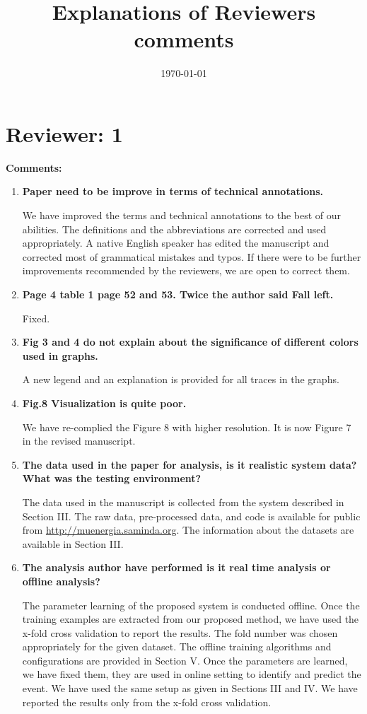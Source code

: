 \documentclass[12pt]{article}
\title{Explanations of Reviewers comments}
\date{\today}
\begin{document}
\maketitle

\section*{Reviewer: 1}


\textbf{Comments:}

\begin{enumerate}

\item \textbf{Paper need to be improve in terms of technical annotations.}

We have improved the terms and technical annotations to the best of our abilities. The 
definitions and the abbreviations are corrected and used appropriately.  A native 
English 
speaker has edited the manuscript and corrected most of grammatical mistakes and typos.  
If there 
were to be further improvements recommended by the reviewers, we are open to correct 
them. 

\item \textbf{Page 4 table 1 page 52 and 53. Twice the author said Fall left.}

Fixed.

\item \textbf{Fig 3 and 4 do not explain about the significance of different colors used 
in 
graphs.}

A new legend and an explanation is provided for all traces in the graphs. 

\item \textbf{Fig.8 Visualization is quite poor.}

We have re-complied the Figure 8 with higher resolution. It is now Figure 7 in the 
revised manuscript.   

\item \textbf{The data used in the paper for analysis, is it realistic system data? What 
was the testing environment?}

The data used in the manuscript is collected from the system described in Section III. 
The 
raw data, pre-processed data, and code is available for public from 
\url{http://muenergia.saminda.org}. The information about the datasets are available in 
Section III. 

\item \textbf{The analysis author have performed is it real time analysis or offline 
analysis?}

The parameter learning of the proposed system is conducted offline. Once the training 
examples are extracted from our proposed method, we have used the x-fold cross validation 
to report the results. The fold number was chosen appropriately for the given dataset. 
The offline training algorithms and configurations are provided in Section V. Once the 
parameters are learned, we have fixed them, they are used in online setting to identify 
and predict the event. We have used the same setup as given in Sections III and IV. We 
have reported the results only from the x-fold cross validation.  

\end{enumerate}
\end{document}
